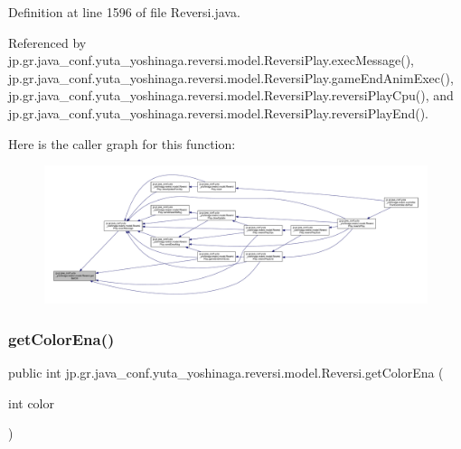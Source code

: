 Definition at line 1596 of file Reversi.\+java.



Referenced by jp.\+gr.\+java\+\_\+conf.\+yuta\+\_\+yoshinaga.\+reversi.\+model.\+Reversi\+Play.\+exec\+Message(), jp.\+gr.\+java\+\_\+conf.\+yuta\+\_\+yoshinaga.\+reversi.\+model.\+Reversi\+Play.\+game\+End\+Anim\+Exec(), jp.\+gr.\+java\+\_\+conf.\+yuta\+\_\+yoshinaga.\+reversi.\+model.\+Reversi\+Play.\+reversi\+Play\+Cpu(), and jp.\+gr.\+java\+\_\+conf.\+yuta\+\_\+yoshinaga.\+reversi.\+model.\+Reversi\+Play.\+reversi\+Play\+End().

Here is the caller graph for this function\+:
\nopagebreak
\begin{figure}[H]
\begin{center}
\leavevmode
\includegraphics[width=350pt]{classjp_1_1gr_1_1java__conf_1_1yuta__yoshinaga_1_1reversi_1_1model_1_1_reversi_a9f826e110ec3298a6bc5d6987a94519c_icgraph}
\end{center}
\end{figure}
\mbox{\label{classjp_1_1gr_1_1java__conf_1_1yuta__yoshinaga_1_1reversi_1_1model_1_1_reversi_ac6fafa41eeff56abfc67b2b5876b50f9}} 
\subsubsection{\texorpdfstring{get\+Color\+Ena()}{getColorEna()}}
{\footnotesize\ttfamily public int jp.\+gr.\+java\+\_\+conf.\+yuta\+\_\+yoshinaga.\+reversi.\+model.\+Reversi.\+get\+Color\+Ena (\begin{DoxyParamCaption}\item[{int}]{color }\end{DoxyParamCaption})}




